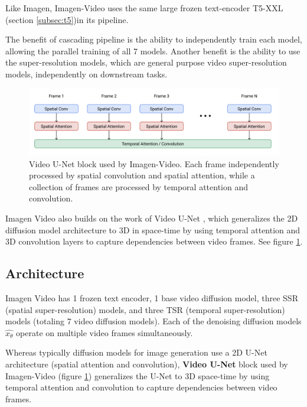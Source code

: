 Like Imagen, Imagen-Video uses the same large frozen text-encoder T5-XXL (section \ref{subsec:t5})in its pipeline.

The benefit of cascading pipeline is the ability to independently train each model, allowing the parallel training of all 7 models. Another benefit is the ability to use the super-resolution models, which are general purpose video super-resolution models, independently on downstream tasks.


\begin{figure}
    \centering
    \includegraphics[width=1\textwidth]{images/imagen_video/video_u_net.png}
    \caption{Video U-Net block \cite{video_diffusion_models} used by Imagen-Video. Each frame independently processed by spatial convolution and spatial attention, while a collection of frames are processed by temporal attention and convolution.}
    \label{fig:imagen_video_video_unet}
\end{figure}


Imagen Video also builds on the work of Video U-Net \cite{video_diffusion_models}, which generalizes the 2D diffusion model architecture to 3D in space-time by using temporal attention and 3D convolution layers to capture dependencies between video frames. See figure \ref{fig:imagen_video_video_unet}.













\subsection{Architecture}

Imagen Video has 1 frozen text encoder, 1 base video diffusion model, three SSR (spatial super-resolution) models, and three TSR (temporal super-resolution) models (totaling 7 video diffusion models). Each of the denoising diffusion models $\hat{x_\theta}$ operate on multiple video frames simultaneously.

Whereas typically diffusion models for image generation use a 2D U-Net architecture (spatial attention and convolution), \textbf{Video U-Net} block used by Imagen-Video (figure \ref{fig:imagen_video_video_unet}) generalizes the U-Net to 3D space-time by using temporal attention and convolution to capture dependencies between video frames.

